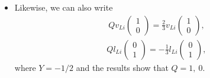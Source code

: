 \documentclass[11pt]{article}
\begin{document}
\begin{itemize}
  \item Likewise, we can also write
  \begin{eqnarray}
    Q v_{Li}
    \begin{pmatrix}
      1\\0
    \end{pmatrix}
    =\frac{2}{3} v_{Li}
    \begin{pmatrix}
      1\\0
    \end{pmatrix},
    \end{eqnarray}
    \begin{eqnarray}
      Q l_{Li}
      \begin{pmatrix}
        0\\1
      \end{pmatrix}
      =-\frac{1}{3} l_{Li}
      \begin{pmatrix}
        0\\1
      \end{pmatrix},
      \end{eqnarray}
      where $Y=-1/2$ and the results show that $Q=1,~0$.
\end{itemize}
\end{document}
